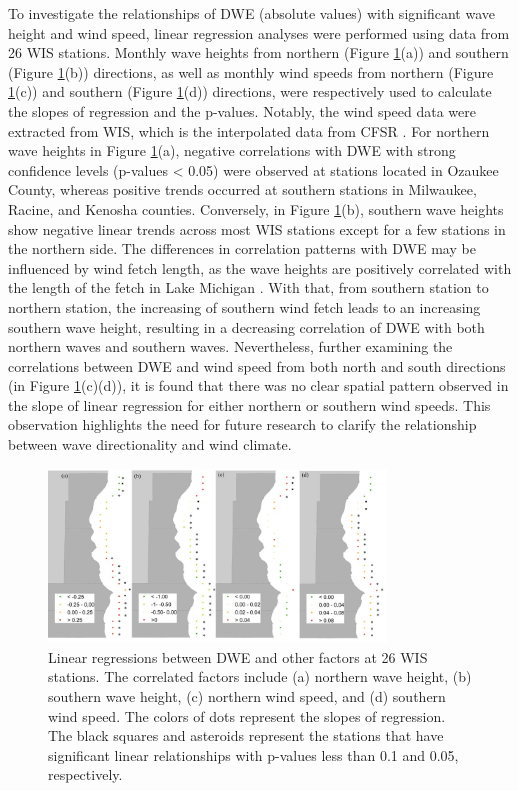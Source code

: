 To investigate the relationships of DWE (absolute values) with significant wave
height and wind speed, linear regression analyses were performed using data from
26 WIS stations. Monthly wave heights from northern (Figure
\ref{fig:fig3.10}(a)) and southern (Figure \ref{fig:fig3.10}(b)) directions, as
well as monthly wind speeds from northern (Figure \ref{fig:fig3.10}(c)) and
southern (Figure \ref{fig:fig3.10}(d)) directions, were respectively used to
calculate the slopes of regression and the p-values. Notably, the wind speed
data were extracted from WIS, which is the interpolated data from CFSR
\citep{saha_ncep_2010,saha_ncep_2014}. For northern wave heights in Figure
\ref{fig:fig3.10}(a), negative correlations with DWE with strong confidence
levels (p-values < 0.05) were observed at stations located in Ozaukee County,
whereas positive trends occurred at southern stations in Milwaukee, Racine, and
Kenosha counties. Conversely, in Figure \ref{fig:fig3.10}(b), southern wave
heights show negative linear trends across most WIS stations except for a few
stations in the northern side. The differences in correlation patterns with DWE
may be influenced by wind fetch length, as the wave heights are positively
correlated with the length of the fetch in Lake Michigan
\citep{mason_effective_2018}. With that, from southern station to northern
station, the increasing of southern wind fetch leads to an increasing southern
wave height, resulting in a decreasing correlation of DWE with both northern
waves and southern waves. Nevertheless, further examining the correlations
between DWE and wind speed from both north and south directions (in Figure
\ref{fig:fig3.10}(c)(d)), it is found that there was no clear spatial pattern
observed in the slope of linear regression for either northern or southern wind
speeds. This observation highlights the need for future research to clarify the
relationship between wave directionality and wind climate.

\begin{figure}[htbp]
  \centering
  \includegraphics[width=0.8\textwidth]{chapter3/resources/figure3-10.jpg}
  \caption{Linear regressions between DWE and other factors at 26 WIS stations. The correlated factors include (a) northern wave height, (b) southern wave height, (c) northern wind speed, and (d) southern wind speed. The colors of dots represent the slopes of regression. The black squares and asteroids represent the stations that have significant linear relationships with p-values less than 0.1 and 0.05, respectively.}
  \label{fig:fig3.10}
\end{figure}

